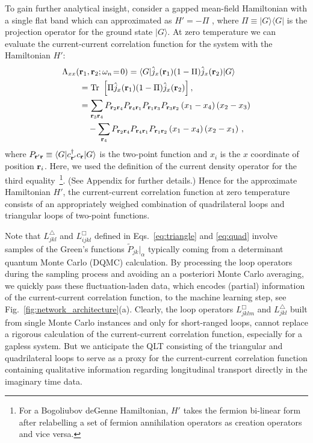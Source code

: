 \documentclass[amsmath,amssymb, aps, prx, longbibliography, twocolumn]{revtex4-1}
\begin{document}
To gain further  analytical insight, consider 
a gapped mean-field Hamiltonian with a single flat band which can approximated as $H'=-\Pi$ , where
$\Pi\equiv |G\rangle \langle G|$ is the projection operator for the ground state $|G\rangle$. At zero temperature we can evaluate the current-current correlation function for the system with the Hamiltonian ${H}'$:
\begin{equation}
\left. \begin{aligned}
\Lambda_{xx}(&{\bf r}_1,{\bf r}_2;\omega_n\!=\!0)
= \langle G|\hat{j}_x({\bf r}_1)(1-\Pi) \hat{j}_x({\bf r}_2)|G\rangle \\
   &={\rm Tr}\ \left[\Pi\hat{j}_x({\bf r}_1)(1-\Pi) \hat{j}_x({\bf r}_2)\right],\\
&= \sum_{{\bf r}_3 {\bf r}_4}P_{{\bf r}_2 {\bf r}_4}P_{{\bf r}_4{\bf r}_1}P_{{\bf r}_1{\bf r}_3}P_{{\bf r}_3{\bf r}_2}\left(x_1-x_4\right)\left(x_2-x_3\right) \\
& \quad - \sum_{{\bf r}_4}P_{{\bf r}_2 {\bf r}_4}P_{{\bf r}_4{\bf r}_1}P_{{\bf r}_1{\bf r}_2}\left(x_1-x_4\right)\left(x_2-x_1\right) \,,
\end{aligned}
\right.
\label{eq:j-j}
\end{equation}
where $P_{{\bf r}'{\bf r}}\equiv \langle G|c^\dagger_{{\bf r}'} c_{\bf r}|G\rangle $ is the two-point function and $x_i$ is the $x$ coordinate of position ${\bf r}_i$. Here, we used the definition of the current density operator for the third equality~\footnote{For a Bogoliubov deGenne Hamiltonian, $H'$ takes the fermion bi-linear form after relabelling a set of fermion annihilation operators as creation operators and vice versa.}.
(See Appendix for further details.)
Hence for the approximate Hamiltonian ${H}'$, the current-current correlation function at zero temperature consists of an appropriately weighed combination of quadrilateral loops and triangular loops of two-point functions.

Note that  $L^\triangle_{jkl}$ and  $L^\Box_{ijkl}$ defined in Eqs.~\eqref{eq:triangle} and \eqref{eq:quad} involve samples of the Green's functions $\widetilde{P}_{jk}|_{\alpha}$ typically coming from a determinant quantum Monte Carlo (DQMC) calculation. 
By processing the loop operators during the sampling process and avoiding an a posteriori Monte Carlo averaging, we quickly pass these fluctuation-laden data, which encodes (partial) information of the current-current correlation function, to the machine learning step, see Fig.~\ref{fig:network_architecture}(a). 
Clearly, the loop operators $L^\Box_{jklm}$ and $ L^\triangle_{jkl}$ built from single Monte Carlo instances and only for short-ranged loops, cannot replace a rigorous calculation of the current-current correlation function, especially for a gapless system. But we anticipate the QLT consisting of the triangular and quadrilateral loops to serve as a  proxy for the current-current correlation function containing qualitative information regarding longitudinal transport directly in the imaginary time data.  
\end{document}
